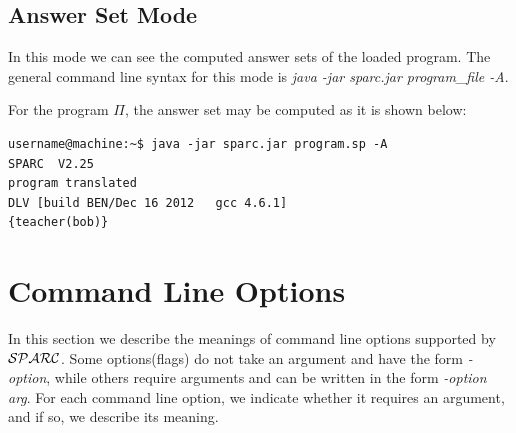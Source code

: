 \documentclass[12pt, letterpaper]{article}
\begin{document}
\subsection{Answer Set Mode}

In this mode we can see the computed answer sets of the loaded program.
The general command line syntax for this mode is \textit{java -jar sparc.jar program\_file -A}.

For the program $\Pi$, the answer set may be computed as it is shown below:
\begin{verbatim}
username@machine:~$ java -jar sparc.jar program.sp -A
SPARC  V2.25
program translated
DLV [build BEN/Dec 16 2012   gcc 4.6.1]
{teacher(bob)}

\end{verbatim}

\section{Command Line Options}\label{option}

In this section we  describe the meanings of command line options supported by
${\cal SPARC}$. Some options(flags) do not take an argument and have the form \textit{-option},
while others require arguments and can be written in the form \textit{-option arg}.
For each command line option, we indicate whether it requires
an argument, and if so, we  describe its meaning.
\end{document}

